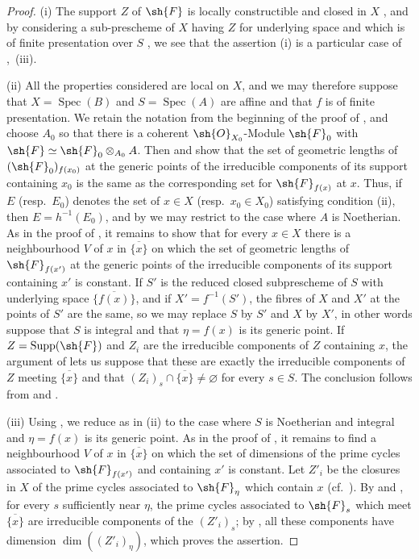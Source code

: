 \begin{proof}
\label{IV.9.9.2-proof}
(i) The support $Z$ of $\sh{F}$ is locally constructible and closed in $X$ , and by considering a sub-prescheme of $X$ having $Z$ for underlying space and which is of finite presentation over $S$ , we see that the assertion (i) is a particular case of ,~(iii).

(ii) All the properties considered are local on $X$, and we may therefore suppose that $X=\operatorname{Spec}(B)$ and $S=\operatorname{Spec}(A)$ are affine and that $f$ is of finite presentation.
We retain the notation from the beginning of the proof of , and choose $A_0$ so that there is a coherent $\sh{O}_{X_0}$-Module $\sh{F}_0$ with $\sh{F}\simeq\sh{F}_0\otimes_{A_0}A$.
Then  and  show that the set of geometric lengths of $(\sh{F}_0)_{f(x_0)}$ at the generic points of the irreducible components of its support containing $x_0$ is the same as the corresponding set for $\sh{F}_{f(x)}$ at $x$.
Thus, if $E$ (resp.~$E_0$) denotes the set of $x\in X$ (resp.~$x_0\in X_0$) satisfying condition (ii), then $E=h^{-1}(E_0)$, and by  we may restrict to the case where $A$ is Noetherian.
As in the proof of , it remains to show that for every $x\in X$ there is a neighbourhood $V$ of $x$ in $\overline{\{x\}}$ on which the set of geometric lengths of $\sh{F}_{f(x')}$ at the generic points of the irreducible components of its support containing $x'$ is constant.
If $S'$ is the reduced closed subprescheme of $S$ with underlying space $\overline{\{f(x)\}}$, and if $X'=f^{-1}(S')$, the fibres of $X$ and $X'$ at the points of $S'$ are the same,
so we may replace $S$ by $S'$ and $X$ by $X'$, in other words suppose that $S$ is integral and that $\eta=f(x)$ is its generic point.
If $Z=\operatorname{Supp}(\sh{F})$ and $Z_i$ are the irreducible components of $Z$ containing $x$, the argument of  lets us suppose that these are exactly the irreducible components of $Z$ meeting $\overline{\{x\}}$ and that $(Z_i)_s\cap\overline{\{x\}}\neq\varnothing$ for every $s\in S$.
The conclusion follows from  and .

(iii) Using , we reduce as in (ii) to the case where $S$ is Noetherian and integral and $\eta=f(x)$ is its generic point.
As in the proof of , it remains to find a neighbourhood $V$ of $x$ in $\overline{\{x\}}$ on which the set of dimensions of the prime cycles associated to $\sh{F}_{f(x')}$ and containing $x'$ is constant.
Let $Z'_i$ be the closures in $X$ of the prime cycles associated to $\sh{F}_\eta$ which contain $x$ (cf.~).
By  and , for every $s$ sufficiently near $\eta$, the prime cycles associated to $\sh{F}_s$ which meet $\overline{\{x\}}$ are irreducible components of the $(Z'_i)_s$; by , all these components have dimension $\dim((Z'_i)_\eta)$, which proves the assertion.


\end{proof}
